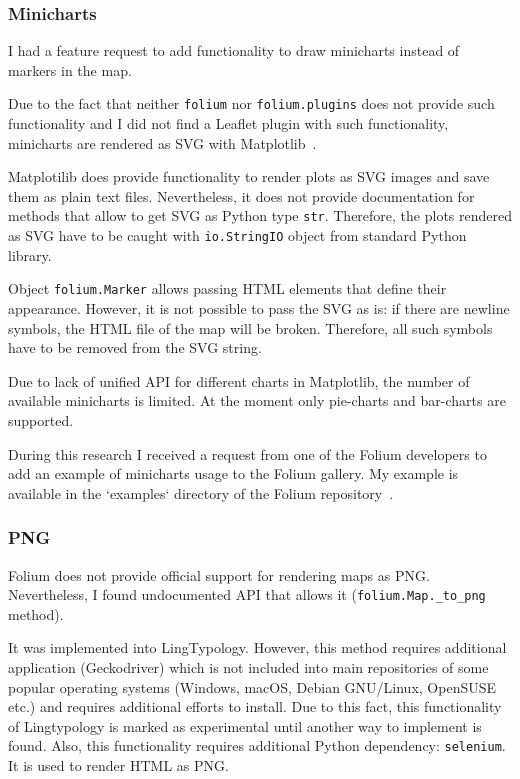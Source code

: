 \documentclass[a4paper,12pt]{article}
\begin{document}
\subsubsection{Minicharts}

I had a feature request to add functionality to draw minicharts instead of markers in the map.

Due to the fact that neither \texttt{folium} nor \texttt{folium.plugins} does not provide such functionality and I did not find a Leaflet plugin with such functionality, minicharts are rendered as SVG with Matplotlib~\parencite{matplotlib}.

Matplotilib does provide functionality to render plots as SVG images and save them as plain text files. Nevertheless, it does not provide documentation for methods that allow to get SVG as Python type \texttt{str}. Therefore, the plots rendered as SVG have to be caught with \texttt{io.StringIO} object from standard Python library.

Object \texttt{folium.Marker} allows passing HTML elements that define their appearance. However, it is not possible to pass the SVG as is: if there are newline symbols, the HTML file of the map will be broken. Therefore, all such symbols have to be removed from the SVG string.

Due to lack of unified API for different charts in Matplotlib, the number of available minicharts is limited. At the moment only pie-charts and bar-charts are supported.

During this research I received a request from one of the Folium developers to add an example of minicharts usage to the Folium gallery. My example is available in the `examples` directory of the Folium repository~\parencite{folium}.

\subsubsection{PNG}

Folium does not provide official support for rendering maps as PNG. Nevertheless, I found undocumented API that allows it (\texttt{folium.Map.\_to\_png} method).

It was implemented into LingTypology. However, this method requires additional application (Geckodriver) which is not included into main repositories of some popular operating systems (Windows, macOS, Debian GNU/Linux, OpenSUSE etc.) and requires additional efforts to install. Due to this fact, this functionality of Lingtypology is marked as experimental until another way to implement is found. Also, this functionality requires additional Python dependency: \texttt{selenium}. It is used to render HTML as PNG.
\end{document}
